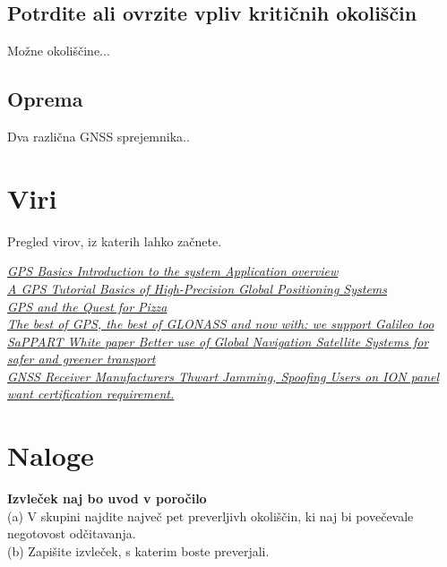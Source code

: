 \subsection{Potrdite ali ovrzite vpliv kritičnih okoliščin}
\label{subsec:GnssPrak_Posk}
Možne okoliščine...


\subsection{Oprema}
\label{subsec:GnssPrak_Oprema}
Dva različna GNSS sprejemnika..

\section{Viri}
\label{sec:GnssPrak_Viri}

Pregled virov, iz katerih lahko začnete.

\href{http://geology.isu.edu/geostac/Field_Exercise/GPS/GPS_basics_u_blox_en.pdf}{\textit{GPS Basics Introduction to the system Application overview}} \\
\href{http://www.javad.com/downloads/javadgnss/publications/GPS-Tutorial.pdf}{\textit{A GPS Tutorial Basics of High-Precision Global Positioning Systems}} \\
\href{http://spaceplace.nasa.gov/gps-pizza/en/}{\textit{GPS and the Quest for Pizza}} \\
\href{http://www.javad.com/downloads/javadgnss/publications/Javad_Munich_07.pdf}{\textit{The best of GPS, the best of GLONASS and now with: we support Galileo too}} \\
\href{http://www.sappart.net/wp-content/uploads/2014/08/White-Paper_SaPPART_sept15.pdf}{\textit{SaPPART White paper Better use of Global Navigation Satellite Systems for safer and greener transport}} \\
\href{http://www.insidegnss.com/node/4684}{\textit{GNSS Receiver Manufacturers Thwart Jamming, Spoofing Users on ION panel want certification requirement.}}

%
%
\section*{Naloge}
\begin{prob}
	\label{Nal:GnssPrak_Izvl}
	\textbf{Izvleček naj bo uvod v poročilo}\\
	(a) V skupini najdite največ pet preverljivh okoliščin, ki naj bi povečevale negotovost odčitavanja.\\
	(b) Zapišite izvleček, s katerim boste preverjali.
\end{prob}

